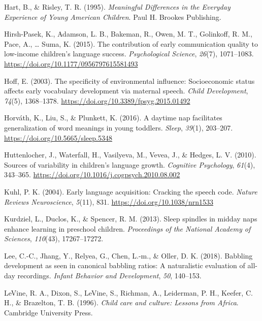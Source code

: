 \documentclass[
  english,
  ,man,floatsintext]{apa6}
\begin{document}
\leavevmode\hypertarget{ref-hart1995meaningful}{}%
Hart, B., \& Risley, T. R. (1995). \emph{Meaningful Differences in the Everyday Experience of Young American Children}. Paul H. Brookes Publishing.

\leavevmode\hypertarget{ref-hirshpasek2015contribution}{}%
Hirsh-Pasek, K., Adamson, L. B., Bakeman, R., Owen, M. T., Golinkoff, R. M., Pace, A., \ldots{} Suma, K. (2015). The contribution of early communication quality to low-income children's language success. \emph{Psychological Science}, \emph{26}(7), 1071--1083. \url{https://doi.org/10.1177/0956797615581493}

\leavevmode\hypertarget{ref-hoff2003specificity}{}%
Hoff, E. (2003). The specificity of environmental influence: Socioeconomic status affects early vocabulary development via maternal speech. \emph{Child Development}, \emph{74}(5), 1368--1378. \url{https://doi.org/10.3389/fpsyg.2015.01492}

\leavevmode\hypertarget{ref-horvath2016daytime}{}%
Horváth, K., Liu, S., \& Plunkett, K. (2016). A daytime nap facilitates generalization of word meanings in young toddlers. \emph{Sleep}, \emph{39}(1), 203--207. \url{https://doi.org/10.5665/sleep.5348}

\leavevmode\hypertarget{ref-huttenlocher2010sources}{}%
Huttenlocher, J., Waterfall, H., Vasilyeva, M., Vevea, J., \& Hedges, L. V. (2010). Sources of variability in children's language growth. \emph{Cognitive Psychology}, \emph{61}(4), 343--365. \url{https://doi.org/10.1016/j.cogpsych.2010.08.002}

\leavevmode\hypertarget{ref-kuhl2004early}{}%
Kuhl, P. K. (2004). Early language acquisition: Cracking the speech code. \emph{Nature Reviews Neuroscience}, \emph{5}(11), 831. \url{https://doi.org/10.1038/nrn1533}

\leavevmode\hypertarget{ref-kurdziel2013sleep}{}%
Kurdziel, L., Duclos, K., \& Spencer, R. M. (2013). Sleep spindles in midday naps enhance learning in preschool children. \emph{Proceedings of the National Academy of Sciences}, \emph{110}(43), 17267--17272.

\leavevmode\hypertarget{ref-lee2018babbling}{}%
Lee, C.-C., Jhang, Y., Relyea, G., Chen, L.-m., \& Oller, D. K. (2018). Babbling development as seen in canonical babbling ratios: A naturalistic evaluation of all-day recordings. \emph{Infant Behavior and Development}, \emph{50}, 140--153.

\leavevmode\hypertarget{ref-levine1996child}{}%
LeVine, R. A., Dixon, S., LeVine, S., Richman, A., Leiderman, P. H., Keefer, C. H., \& Brazelton, T. B. (1996). \emph{Child care and culture: Lessons from Africa}. Cambridge University Press.
\end{document}
